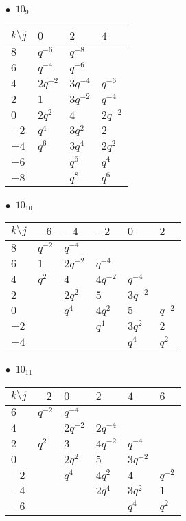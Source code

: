 %
\begin{minipage}{\linewidth}
$\bullet\ $ $10_{9}$ \vspace{0.5em} \\
\begin{tabular}{l|lll}
$k \setminus j$ & $0$ & $2$ & $4$ \\
\hline
$8$ & $q^{-6}$ & $q^{-8}$ &  \\
$6$ & $q^{-4}$ & $q^{-6}$ &  \\
$4$ & $2q^{-2}$ & $3q^{-4}$ & $q^{-6}$ \\
$2$ & $1$ & $3q^{-2}$ & $q^{-4}$ \\
$0$ & $2q^{2}$ & $4$ & $2q^{-2}$ \\
$-2$ & $q^{4}$ & $3q^{2}$ & $2$ \\
$-4$ & $q^{6}$ & $3q^{4}$ & $2q^{2}$ \\
$-6$ &  & $q^{6}$ & $q^{4}$ \\
$-8$ &  & $q^{8}$ & $q^{6}$ \\
\end{tabular}
\vspace{2em}
\end{minipage}
%
\begin{minipage}{\linewidth}
$\bullet\ $ $10_{10}$ \vspace{0.5em} \\
\begin{tabular}{l|lllll}
$k \setminus j$ & $-6$ & $-4$ & $-2$ & $0$ & $2$ \\
\hline
$8$ & $q^{-2}$ & $q^{-4}$ &  &  &  \\
$6$ & $1$ & $2q^{-2}$ & $q^{-4}$ &  &  \\
$4$ & $q^{2}$ & $4$ & $4q^{-2}$ & $q^{-4}$ &  \\
$2$ &  & $2q^{2}$ & $5$ & $3q^{-2}$ &  \\
$0$ &  & $q^{4}$ & $4q^{2}$ & $5$ & $q^{-2}$ \\
$-2$ &  &  & $q^{4}$ & $3q^{2}$ & $2$ \\
$-4$ &  &  &  & $q^{4}$ & $q^{2}$ \\
\end{tabular}
\vspace{2em}
\end{minipage}
%
\begin{minipage}{\linewidth}
$\bullet\ $ $10_{11}$ \vspace{0.5em} \\
\begin{tabular}{l|lllll}
$k \setminus j$ & $-2$ & $0$ & $2$ & $4$ & $6$ \\
\hline
$6$ & $q^{-2}$ & $q^{-4}$ &  &  &  \\
$4$ &  & $2q^{-2}$ & $2q^{-4}$ &  &  \\
$2$ & $q^{2}$ & $3$ & $4q^{-2}$ & $q^{-4}$ &  \\
$0$ &  & $2q^{2}$ & $5$ & $3q^{-2}$ &  \\
$-2$ &  & $q^{4}$ & $4q^{2}$ & $4$ & $q^{-2}$ \\
$-4$ &  &  & $2q^{4}$ & $3q^{2}$ & $1$ \\
$-6$ &  &  &  & $q^{4}$ & $q^{2}$ \\
\end{tabular}
\vspace{2em}
\end{minipage}
